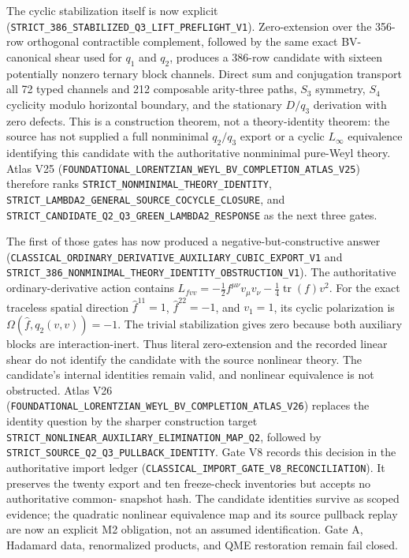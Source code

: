 \documentclass[11pt]{article}
\theoremstyle{definition}
\theoremstyle{remark}
\newcommand{\cert}[1]{\nolinkurl{#1}}
\begin{document}
The cyclic stabilization itself is now explicit
(\cert{STRICT_386_STABILIZED_Q3_LIFT_PREFLIGHT_V1}).  Zero-extension over the
356-row orthogonal contractible complement, followed by the same exact
BV-canonical shear used for $q_1$ and $q_2$, produces a 386-row candidate with
sixteen potentially nonzero ternary block channels.  Direct sum and conjugation
transport all 72 typed channels and 212 composable arity-three paths, $S_3$
symmetry, $S_4$ cyclicity modulo horizontal boundary, and the stationary
$D/q_3$ derivation with zero defects.  This is a construction theorem, not a
theory-identity theorem: the source has not supplied a full nonminimal $q_2/q_3$
export or a cyclic $L_\infty$ equivalence identifying this candidate with the
authoritative nonminimal pure-Weyl theory.  Atlas V25
(\cert{FOUNDATIONAL_LORENTZIAN_WEYL_BV_COMPLETION_ATLAS_V25}) therefore ranks
\cert{STRICT_NONMINIMAL_THEORY_IDENTITY},
\cert{STRICT_LAMBDA2_GENERAL_SOURCE_COCYCLE_CLOSURE}, and
\cert{STRICT_CANDIDATE_Q2_Q3_GREEN_LAMBDA2_RESPONSE} as the next three gates.

The first of those gates has now produced a negative-but-constructive answer
(\cert{CLASSICAL_ORDINARY_DERIVATIVE_AUXILIARY_CUBIC_EXPORT_V1} and
\cert{STRICT_386_NONMINIMAL_THEORY_IDENTITY_OBSTRUCTION_V1}).  The authoritative
ordinary-derivative action contains
\(L_{fvv}=-\frac12 f^{\mu\nu}v_\mu v_\nu-\frac14\operatorname{tr}(f)v^2\).
For the exact traceless spatial direction
\(\widehat f^{11}=1\), \(\widehat f^{22}=-1\), and \(v_1=1\), its cyclic
polarization is \(\Omega(\widehat f,q_2(v,v))=-1\).  The trivial stabilization
gives zero because both auxiliary blocks are interaction-inert.  Thus literal
zero-extension and the recorded linear shear do not identify the candidate
with the source nonlinear theory.  The candidate's internal identities remain
valid, and nonlinear equivalence is not obstructed.  Atlas V26
(\cert{FOUNDATIONAL_LORENTZIAN_WEYL_BV_COMPLETION_ATLAS_V26}) replaces the
identity question by the sharper construction target
\cert{STRICT_NONLINEAR_AUXILIARY_ELIMINATION_MAP_Q2}, followed by
\cert{STRICT_SOURCE_Q2_Q3_PULLBACK_IDENTITY}.
Gate V8 records this decision in the authoritative import ledger
(\cert{CLASSICAL_IMPORT_GATE_V8_RECONCILIATION}).  It preserves the twenty
export and ten freeze-check inventories but accepts no authoritative common-
snapshot hash.  The candidate identities survive as scoped evidence; the
quadratic nonlinear equivalence map and its source pullback replay are now an
explicit M2 obligation, not an assumed identification.  Gate A, Hadamard
data, renormalized products, and QME restoration remain fail closed.
\end{document}
